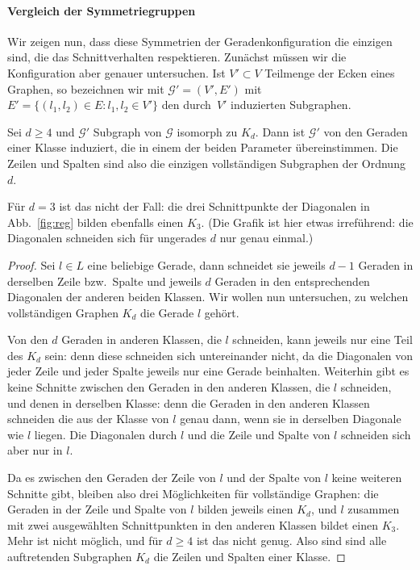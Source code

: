 \paragraph{Vergleich der Symmetriegruppen} Wir zeigen nun, dass diese Symmetrien der Geradenkonfiguration die einzigen sind, die das Schnittverhalten respektieren. Zunächst müssen wir die Konfiguration aber genauer untersuchen. Ist $V' \subset V$ Teilmenge der Ecken eines Graphen, so bezeichnen wir mit $\mathcal G' = (V', E')$ mit $E' = \{(l_1, l_2) \in E \colon l_1, l_2 \in V'\}$ den durch~$V'$ induzierten Subgraphen.

\begin{lemma}
Sei $d \geq 4$ und $\mathcal G'$ Subgraph von $\mathcal G$ isomorph zu $K_d$. Dann ist $\mathcal G'$ von den Geraden einer Klasse induziert, die in einem der beiden Parameter übereinstimmen. Die Zeilen und Spalten sind also die einzigen vollständigen Subgraphen der Ordnung $d$.
\end{lemma}
\begin{remarks}
Für $d=3$ ist das nicht der Fall: die drei Schnittpunkte der Diagonalen in Abb.~\ref{fig:reg} bilden ebenfalls einen $K_3$. (Die Grafik ist hier etwas irreführend: die Diagonalen schneiden sich für ungerades $d$ nur genau einmal.)
\end{remarks}
\begin{proof}
Sei $l \in L$ eine beliebige Gerade, dann schneidet sie jeweils $d-1$ Geraden in derselben Zeile bzw.~Spalte und jeweils $d$ Geraden in den entsprechenden Diagonalen der anderen beiden Klassen. Wir wollen nun untersuchen, zu welchen vollständigen Graphen $K_d$ die Gerade $l$ gehört.

Von den $d$ Geraden in anderen Klassen, die $l$ schneiden, kann jeweils nur eine Teil des $K_d$ sein: denn diese schneiden sich untereinander nicht, da die Diagonalen von jeder Zeile und jeder Spalte jeweils nur eine Gerade beinhalten. Weiterhin gibt es keine Schnitte zwischen den Geraden in den anderen Klassen, die $l$ schneiden, und denen in derselben Klasse: denn die Geraden in den anderen Klassen schneiden die aus der Klasse von $l$ genau dann, wenn sie in derselben Diagonale wie $l$ liegen. Die Diagonalen durch $l$ und die Zeile und Spalte von $l$ schneiden sich aber nur in $l$.

Da es zwischen den Geraden der Zeile von $l$ und der Spalte von $l$ keine weiteren Schnitte gibt, bleiben also drei Möglichkeiten für vollständige Graphen: die Geraden in der Zeile und Spalte von $l$ bilden jeweils einen $K_d$, und $l$ zusammen mit zwei ausgewählten Schnittpunkten in den anderen Klassen bildet einen $K_3$. Mehr ist nicht möglich, und für $d \geq 4$ ist das nicht genug. Also sind sind alle auftretenden Subgraphen $K_d$ die Zeilen und Spalten einer Klasse.
\end{proof}
